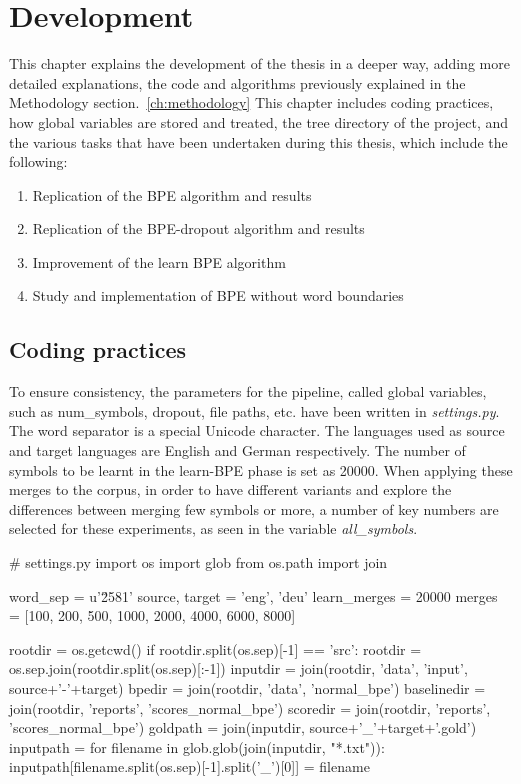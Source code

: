 %
%

\chapter{Development}\label{ch:development}

This chapter explains the development of the thesis in a deeper way, adding more detailed explanations, the code and algorithms previously explained in the Methodology section.~\ref{ch:methodology} This chapter includes coding practices, how global variables are stored and treated, the tree directory of the project, and the various tasks that have been undertaken during this thesis, which include the following:

\begin{enumerate}
  \item Replication of the BPE algorithm and results
  \item Replication of the BPE-dropout algorithm and results
  \item Improvement of the learn BPE algorithm
  \item Study and implementation of BPE without word boundaries
\end{enumerate}

\section{Coding practices}

To ensure consistency, the parameters for the pipeline, called global variables, such as num\_symbols, dropout, file paths, etc. have been written in \emph{settings.py}. The word separator is a special Unicode character. The languages used as source and target languages are English and German respectively. The number of symbols to be learnt in the learn-BPE phase is set as 20000. When applying these merges to the corpus, in order to have different variants and explore the differences between merging few symbols or more, a number of key numbers are selected for these experiments, as seen in the variable \emph{all\_symbols}.

\begin{python}
# settings.py
import os
import glob
from os.path import join

word_sep = u'\u2581'
source, target = 'eng', 'deu'
learn_merges = 20000
merges = [100, 200, 500, 1000, 2000, 4000, 6000, 8000]

rootdir = os.getcwd()
if rootdir.split(os.sep)[-1] == 'src':
    rootdir = os.sep.join(rootdir.split(os.sep)[:-1])
inputdir = join(rootdir, 'data', 'input', source+'-'+target)
bpedir = join(rootdir, 'data', 'normal_bpe')
baselinedir = join(rootdir, 'reports', 'scores_normal_bpe')
scoredir = join(rootdir, 'reports', 'scores_normal_bpe')
goldpath = join(inputdir, source+'_'+target+'.gold')
inputpath = {}
for filename in glob.glob(join(inputdir, "*.txt")):
  inputpath[filename.split(os.sep)[-1].split('_')[0]] = filename
\end{python}

